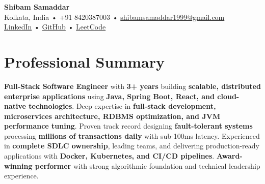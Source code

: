 \documentclass[a4paper,10pt]{article}
\begin{document}
\begin{center}
    {\Large \textbf{Shibam Samaddar}}\\
    \vspace{1pt}
    Kolkata, India • +91 8420387003 • 
    \href{mailto:shibamsamaddar1999@gmail.com}{shibamsamaddar1999@gmail.com}\\
    \href{https://linkedin.com/in/shibam-samaddar-177a2b1aa}{LinkedIn} •
    \href{https://github.com/shibam-max}{GitHub} •
    \href{https://leetcode.com/u/shibamsamaddar1999/}{LeetCode}
\end{center}

\vspace{-8pt}

\section*{Professional Summary}
\vspace{-4pt}
\textbf{Full-Stack Software Engineer} with \textbf{3+ years} building \textbf{scalable, distributed enterprise applications} using \textbf{Java, Spring Boot, React, and cloud-native technologies}. Deep expertise in \textbf{full-stack development, microservices architecture, RDBMS optimization, and JVM performance tuning}. Proven track record designing \textbf{fault-tolerant systems} processing \textbf{millions of transactions daily} with sub-100ms latency. Experienced in \textbf{complete SDLC ownership}, leading teams, and delivering production-ready applications with \textbf{Docker, Kubernetes, and CI/CD pipelines}. \textbf{Award-winning performer} with strong algorithmic foundation and technical leadership experience.

\vspace{-2pt}
\end{document}
